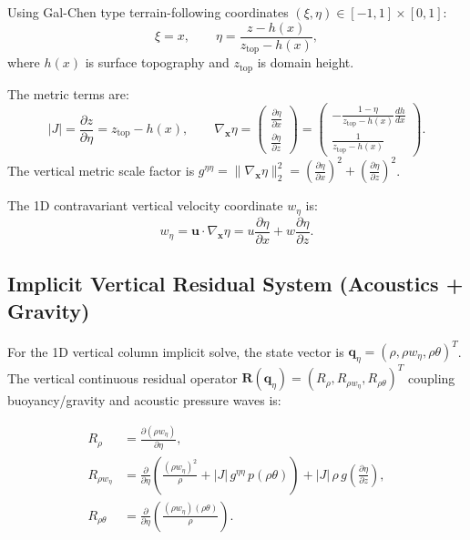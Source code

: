 \documentclass[11pt,a4paper]{article}
\begin{document}
	Using Gal-Chen type terrain-following coordinates $(\xi, \eta) \in [-1, 1] \times [0, 1]$:
	\begin{equation}
		\xi = x, \qquad \eta = \frac{z - h(x)}{z_{\text{top}} - h(x)},
	\end{equation}
	where $h(x)$ is surface topography and $z_{\text{top}}$ is domain height. 
	
	The metric terms are:
	\begin{equation}
		|J| = \frac{\partial z}{\partial \eta} = z_{\text{top}} - h(x), \qquad 
		\nabla_{\boldsymbol{x}} \eta = \begin{pmatrix} \frac{\partial \eta}{\partial x} \\[4pt] \frac{\partial \eta}{\partial z} \end{pmatrix} = \begin{pmatrix} -\frac{1 - \eta}{z_{\text{top}} - h(x)} \frac{dh}{dx} \\[6pt] \frac{1}{z_{\text{top}} - h(x)} \end{pmatrix}.
	\end{equation}
	The vertical metric scale factor is $g^{\eta\eta} = \|\nabla_{\boldsymbol{x}} \eta\|_2^2 = \left(\frac{\partial \eta}{\partial x}\right)^2 + \left(\frac{\partial \eta}{\partial z}\right)^2$.
	
	The 1D contravariant vertical velocity coordinate $w_\eta$ is:
	\begin{equation}
		w_\eta = \boldsymbol{u} \cdot \nabla_{\boldsymbol{x}} \eta = u \frac{\partial \eta}{\partial x} + w \frac{\partial \eta}{\partial z}.
	\end{equation}
	
	
	\subsection{Implicit Vertical Residual System (Acoustics + Gravity)}
	
	For the 1D vertical column implicit solve, the state vector is $\boldsymbol{q}_\eta = (\rho, \rho w_\eta, \rho \theta)^T$. The vertical continuous residual operator $\mathbf{R}(\boldsymbol{q}_\eta) = (R_\rho, R_{\rho w_\eta}, R_{\rho\theta})^T$ coupling buoyancy/gravity and acoustic pressure waves is:
	
	\begin{align}
		R_\rho &= \frac{\partial (\rho w_\eta)}{\partial \eta}, \\[8pt]
		R_{\rho w_\eta} &= \frac{\partial}{\partial \eta} \left( \frac{(\rho w_\eta)^2}{\rho} + |J| \, g^{\eta\eta} \, p(\rho\theta) \right) + |J| \, \rho \, g \left( \frac{\partial \eta}{\partial z} \right), \\[8pt]
		R_{\rho \theta} &= \frac{\partial}{\partial \eta} \left( \frac{(\rho w_\eta)(\rho \theta)}{\rho} \right).
	\end{align}
	
\end{document}

